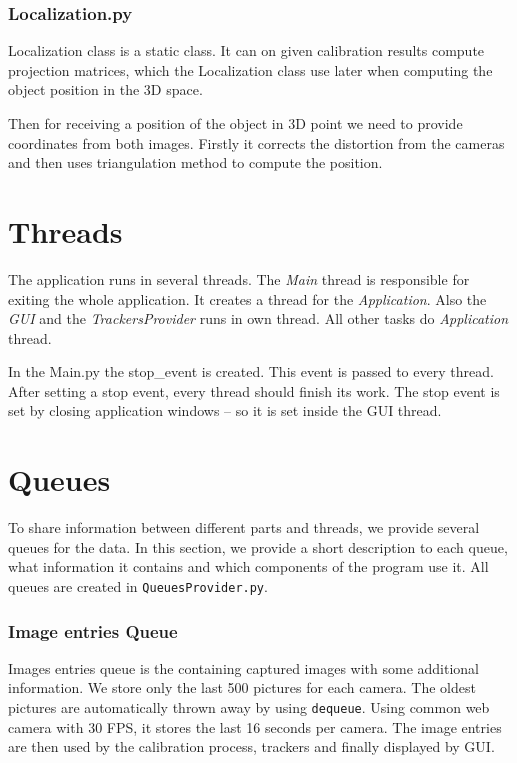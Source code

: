 \subsubsection*{Localization.py}

Localization class is a static class. It can on given calibration results
compute projection matrices, which the Localization class use later when
computing the object position in the 3D space.

Then for receiving a position of the object in 3D point we need to provide
coordinates from both images. Firstly it corrects the distortion from the
cameras and then uses triangulation method to compute the position.

\section{Threads}

The application runs in several threads. The \emph{Main} thread is responsible
for exiting the whole application. It creates a thread for the
\emph{Application}. Also the \emph{GUI} and the \emph{TrackersProvider}
runs in own thread. All other tasks do \emph{Application} thread.

In the Main.py the stop\_event is created. This event is passed to every
thread. After setting a stop event, every thread should finish its work. The
stop event is set by closing application windows -- so it is set inside the GUI
thread.

\section{Queues}

To share information between different parts and threads, we provide several
queues for the data. In this section, we provide a short description to each
queue, what information it contains and which components of the program use it.
All queues are created in \verb+QueuesProvider.py+. 

\subsubsection{Image entries Queue}

Images entries queue is the containing captured images with some additional
information. We store only the last 500 pictures for each camera. The oldest
pictures are automatically thrown away by using \verb+dequeue+. Using common
web camera with 30 FPS, it stores the last 16 seconds per camera. The image
entries are then used by the calibration process, trackers and finally
displayed by GUI.

